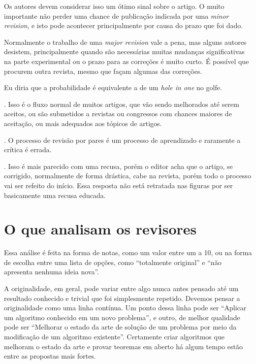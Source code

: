 \documentclass[openany]{book}
\begin{document}
 Os autores devem considerar isso um ótimo sinal sobre o artigo. O muito importante não perder uma chance de publicação indicada por uma \textit{minor revision}, e isto pode acontecer principalmente por causa do prazo que foi dado.

 Normalmente o trabalho de uma \textit{major revision} vale a pena, mas alguns autores desistem, principalmente quando são necessárias muitas mudanças significativas na parte experimental ou o prazo para as correções é muito curto. É possível que procurem outra revista, mesmo que façam algumas das correções.

 Eu diria que a probabilidade é equivalente a de um \textit{hole in one} no golfe.

. Isso é o fluxo normal de muitos artigos, que vão sendo melhorados até serem aceitos, ou são submetidos a revistas ou congressos com chances maiores de aceitação, ou mais adequados aos tópicos de artigos.

. O processo de revisão por pares é um processo de aprendizado e raramente a crítica é errada.


. Isso é mais parecido com uma recusa, porém o editor acha que o artigo, se corrigido, normalmente de forma drástica, cabe na revista, porém todo o processo vai ser refeito do início. Essa resposta não está retratada nas figuras por ser basicamente uma recusa educada.

\section{O que analisam os revisores}

 Essa análise é feita na forma de notas, como um valor entre um a 10, ou na forma de escolha entre uma lista de opções, como ``totalmente original'' e ``não apresenta nenhuma ideia nova''.


 A originalidade, em geral, pode variar entre algo nunca antes pensado até um resultado conhecido e trivial que foi simplesmente repetido. Devemos pensar a originalidade como uma linha contínua. Um ponto dessa linha pode ser ``Aplicar um algoritmo conhecido em um novo problema'', e outro, de melhor qualidade pode ser ``Melhorar o estado da arte de solução de um problema por meio da modificação de um algoritmo existente''. Certamente criar algoritmos que melhoram o estado da arte e provar teoremas em aberto há algum tempo estão entre as propostas mais fortes.
\end{document}
